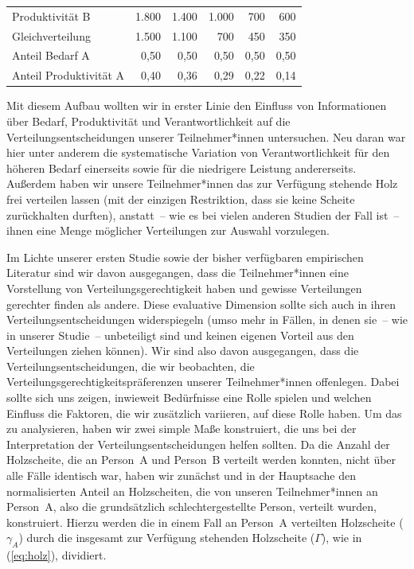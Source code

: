 \documentclass[justified,nobib,nohyper,symmetric,twoside]{tufte-book}
\begin{document}
\begin{table}[t]
\begin{center}
\begin{tabular}{lrrrrr}
   Produktivität B        & 1.800                 & 1.400                 & 1.000                 & 700                   & 600                   \\
   Gleichverteilung       & 1.500                 & 1.100                 & 700                   & 450                   & 350                   \\
   Anteil Bedarf A        & 0,50                  & 0,50                  & 0,50                  & 0,50                  & 0,50                  \\
   Anteil Produktivität A & 0,40                  & 0,36                  & 0,29                  & 0,22                  & 0,14                  \\
   \hline
   \end{tabular}
   \end{center}
\end{table}	

Mit diesem Aufbau wollten wir in erster Linie den Einfluss von Informationen über Bedarf, Produktivität und Verantwortlichkeit auf die Verteilungsentscheidungen unserer Teilnehmer*innen untersuchen.
Neu daran war hier unter anderem die systematische Variation von Verantwortlichkeit für den höheren Bedarf einerseits sowie für die niedrigere Leistung andererseits.
Außerdem haben wir unsere Teilnehmer*innen das zur Verfügung stehende Holz frei verteilen lassen (mit der einzigen Restriktion, dass sie keine Scheite zurückhalten durften), anstatt~-- wie es bei vielen anderen Studien der Fall ist~-- ihnen eine Menge möglicher Verteilungen zur Auswahl vorzulegen.

Im Lichte unserer ersten Studie sowie der bisher verfügbaren empirischen Literatur sind wir davon ausgegangen, dass die Teilnehmer*innen eine Vorstellung von Verteilungsgerechtigkeit haben und gewisse Verteilungen gerechter finden als andere.
Diese evaluative Dimension sollte sich auch in ihren Verteilungsentscheidungen widerspiegeln (umso mehr in Fällen, in denen sie~-- wie in unserer Studie~-- unbeteiligt sind und keinen eigenen Vorteil aus den Verteilungen ziehen können).
Wir sind also davon ausgegangen, dass die Verteilungsentscheidungen, die wir beobachten, die Verteilungsgerechtigkeitspräferenzen unserer Teilnehmer*innen offenlegen.
Dabei sollte sich uns zeigen, inwieweit Bedürfnisse eine Rolle spielen und welchen Einfluss die Faktoren, die wir zusätzlich variieren, auf diese Rolle haben.
Um das zu analysieren, haben wir zwei simple Maße konstruiert, die uns bei der Interpretation der Verteilungsentscheidungen helfen sollten.
Da die Anzahl der Holzscheite, die an Person~A und Person~B verteilt werden konnten, nicht über alle Fälle identisch war, haben wir zunächst und in der Hauptsache den normalisierten Anteil an Holzscheiten, die von unseren Teilnehmer*innen an Person~A, also die grundsätzlich schlechtergestellte Person, verteilt wurden, konstruiert.
Hierzu werden die in einem Fall an Person~A verteilten Holzscheite ($\gamma_{A}$) durch die insgesamt zur Verfügung stehenden Holzscheite ($\Gamma$), wie in (\ref{eq:holz}), dividiert.
\end{document}
